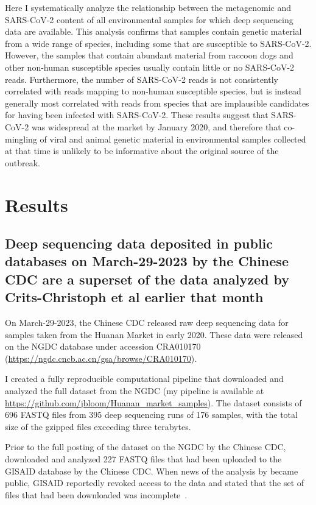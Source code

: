 \documentclass[9pt,twocolumn,twoside]{gsajnl_modified}
\begin{document}
Here I systematically analyze the relationship between the metagenomic and SARS-CoV-2 content of all environmental samples for which deep sequencing data are available.
This analysis confirms that samples contain genetic material from a wide range of species, including some that are susceptible to SARS-CoV-2.
However, the samples that contain abundant material from raccoon dogs and other non-human susceptible species usually contain little or no SARS-CoV-2 reads.
Furthermore, the number of SARS-CoV-2 reads is not consistently correlated with reads mapping to non-human susceptible species, but is instead generally most correlated with reads from species that are implausible candidates for having been infected with SARS-CoV-2.
These results suggest that SARS-CoV-2 was widespread at the market by January 2020, and therefore that co-mingling of viral and animal genetic material in environmental samples collected at that time is unlikely to be informative about the original source of the outbreak.

\section{Results}

\subsection{Deep sequencing data deposited in public databases on March-29-2023 by the Chinese CDC are a superset of the data analyzed by Crits-Christoph et al earlier that month}
On March-29-2023, the Chinese CDC released raw deep sequencing data for samples taken from the Huanan Market in early 2020.
These data were released on the NGDC database under accession CRA010170 (\url{https://ngdc.cncb.ac.cn/gsa/browse/CRA010170}).

I created a fully reproducible computational pipeline that downloaded and analyzed the full dataset from the NGDC (my pipeline is available at \url{https://github.com/jbloom/Huanan_market_samples}).
The dataset consists of 696 FASTQ files from 395 deep sequencing runs of 176 samples, with the total size of the gzipped files exceeding three terabytes.

Prior to the full posting of the dataset on the NGDC by the Chinese CDC, \citet{crits2023genetic} downloaded and analyzed 227 FASTQ files that had been uploaded to the GISAID database by the Chinese CDC.
When news of the analysis by \citet{crits2023genetic} became public, GISAID reportedly revoked access to the data and stated that the set of files that had been downloaded was incomplete~\citep{cohen2023new,gisaid_statement}.
\end{document}
